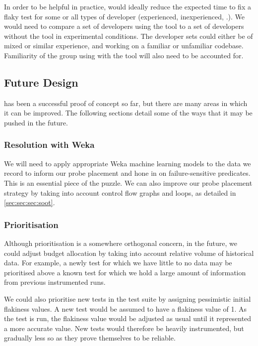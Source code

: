 In order to be helpful in practice, \venera would ideally reduce the expected
time to fix a flaky test for some or all types of developer (experienced,
inexperienced, \etc.). We would need to compare a set of developers using the
tool to a set of developers without the tool in experimental conditions. The
developer sets could either be of mixed or similar experience, and working on a
familiar or unfamiliar codebase. Familiarity of the group using \venera with
the tool will also need to be accounted for.


\subsection{Future Design}
\label{sec:sec:future_design}

\venera has been a successful proof of concept so far, but there are many areas
in which it can be improved. The following sections detail some of the ways that
it may be pushed in the future.

\subsubsection{Resolution with Weka}

We will need to apply appropriate Weka machine learning models to the data we
record to inform our probe placement and hone in on failure-sensitive
predicates. This is an essential piece of the puzzle. We can also improve our
probe placement strategy by taking into account control flow graphs and loops,
as detailed in \autoref{sec:sec:sec:soot}.

\subsubsection{Prioritisation}

Although prioritisation is a somewhere orthogonal concern, in the future, we
could adjust \flaky budget allocation by taking into account relative volume of
historical data. For example, a newly \flaky test for which we have little to no
data may be prioritised above a known \flaky test for which we hold a large
amount of information from previous instrumented runs.

We could also prioritise new tests in the test suite by assigning pessimistic
initial flakiness values. A new test would be assumed to have a flakiness value
of 1. As the test is run, the flakiness value would be adjusted as usual until
it represented a more accurate value. New tests would therefore be heavily
instrumented, but gradually less so as they prove themselves to be reliable.

